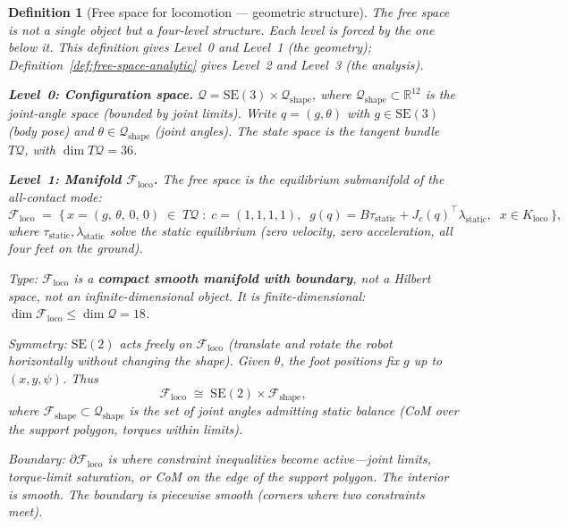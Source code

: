 \documentclass[11pt,a4paper]{article}
\newtheorem{definition}[theorem]{Definition}
\newcommand{\R}{\mathbb{R}}
\newcommand{\cF}{\mathcal{F}}
\begin{document}


\begin{definition}[Free space for locomotion --- geometric structure]
\label{def:free-space-locomotion}
The \emph{free space} is not a single object
but a four-level structure.
Each level is forced by the one below it.
This definition gives Level~0 and Level~1
(the geometry);
Definition~\ref{def:free-space-analytic} gives
Level~2 and Level~3 (the analysis).

\medskip\noindent
\textbf{Level~0: Configuration space.}\;
$\mathcal{Q} = \mathrm{SE}(3) \times \mathcal{Q}_{\mathrm{shape}}$,
where $\mathcal{Q}_{\mathrm{shape}} \subset \R^{12}$
is the joint-angle space (bounded by joint limits).
Write $q = (g, \theta)$ with
$g \in \mathrm{SE}(3)$ (body pose)
and $\theta \in \mathcal{Q}_{\mathrm{shape}}$ (joint angles).
The state space is the tangent bundle
$T\mathcal{Q}$, with $\dim T\mathcal{Q} = 36$.

\medskip\noindent
\textbf{Level~1: Manifold $\cF_{\mathrm{loco}}$.}\;
The free space is the equilibrium submanifold
of the all-contact mode:
\begin{equation}\label{eq:free-space}
  \cF_{\mathrm{loco}}
  \;=\;
  \bigl\{\,
    x = (g,\, \theta,\, 0,\, 0)
    \;\in\; T\mathcal{Q}
    \;:\;
    c = (1,1,1,1),\;\;
    g(q) = B\tau_{\mathrm{static}}
      + J_c(q)^{\!\top}\lambda_{\mathrm{static}},\;\;
    x \in K_{\mathrm{loco}}
  \,\bigr\},
\end{equation}
where $\tau_{\mathrm{static}}, \lambda_{\mathrm{static}}$
solve the static equilibrium
(zero velocity, zero acceleration,
all four feet on the ground).

\emph{Type:}\;
$\cF_{\mathrm{loco}}$ is a \textbf{compact smooth
manifold with boundary},
not a Hilbert space,
not an infinite-dimensional object.
It is finite-dimensional:
$\dim \cF_{\mathrm{loco}} \leq \dim \mathcal{Q} = 18$.

\emph{Symmetry:}\;
$\mathrm{SE}(2)$ acts freely on $\cF_{\mathrm{loco}}$
(translate and rotate the robot horizontally
without changing the shape).
Given $\theta$, the foot positions fix $g$
up to $(x, y, \psi)$.
Thus
\begin{equation}\label{eq:free-space-decomp}
  \cF_{\mathrm{loco}}
  \;\cong\;
  \mathrm{SE}(2) \times \cF_{\mathrm{shape}},
\end{equation}
where
$\cF_{\mathrm{shape}} \subset \mathcal{Q}_{\mathrm{shape}}$
is the set of joint angles admitting static balance
(CoM over the support polygon,
torques within limits).

\emph{Boundary:}\;
$\partial \cF_{\mathrm{loco}}$ is where
constraint inequalities become active---joint limits,
torque-limit saturation,
or CoM on the edge of the support polygon.
The interior is smooth.
The boundary is piecewise smooth
(corners where two constraints meet).
\end{definition}
\end{document}
